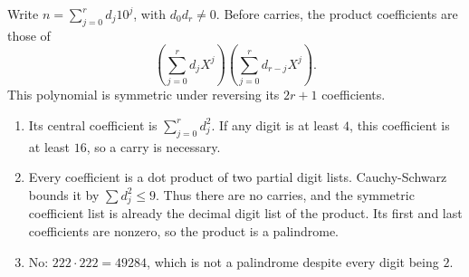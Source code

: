 Write $n=\sum_{j=0}^r d_j10^j$, with $d_0d_r\ne0$. Before carries, the product coefficients are those of
\[
\left(\sum_{j=0}^r d_jX^j\right)
\left(\sum_{j=0}^r d_{r-j}X^j\right).
\]
This polynomial is symmetric under reversing its $2r+1$ coefficients.
\begin{enumerate}
\item Its central coefficient is $\sum_{j=0}^r d_j^2$. If any digit is at least $4$, this coefficient is at least $16$, so a carry is necessary.
\item Every coefficient is a dot product of two partial digit lists. Cauchy-Schwarz bounds it by $\sum d_j^2\le9$. Thus there are no carries, and the symmetric coefficient list is already the decimal digit list of the product. Its first and last coefficients are nonzero, so the product is a palindrome.
\item No: $\boxed{222\cdot222=49284}$, which is not a palindrome despite every digit being $2$.
\end{enumerate}
